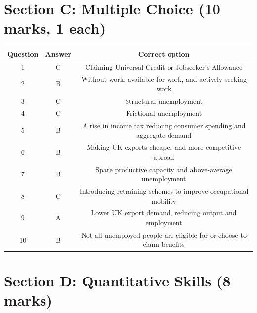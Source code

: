 \documentclass[12pt,a4paper]{article}
\begin{document}
\newpage

\section*{Section C: Multiple Choice (10 marks, 1 each)}

\vspace{0.5em}

\begin{table}[h]
    \centering
    \renewcommand{\arraystretch}{1.3}
    \begin{tabular}{@{}ccc@{}}
        \toprule
        \textbf{Question} & \textbf{Answer} & \textbf{Correct option} \\ \midrule
        1  & C & Claiming Universal Credit or Jobseeker's Allowance \\
        2  & B & Without work, available for work, and actively seeking work \\
        3  & C & Structural unemployment \\
        4  & C & Frictional unemployment \\
        5  & B & A rise in income tax reducing consumer spending and aggregate demand \\
        6  & B & Making UK exports cheaper and more competitive abroad \\
        7  & B & Spare productive capacity and above-average unemployment \\
        8  & C & Introducing retraining schemes to improve occupational mobility \\
        9  & A & Lower UK export demand, reducing output and employment \\
        10 & B & Not all unemployed people are eligible for or choose to claim benefits \\ \bottomrule
    \end{tabular}
\end{table}

\newpage

\section*{Section D: Quantitative Skills (8 marks)}
\end{document}
